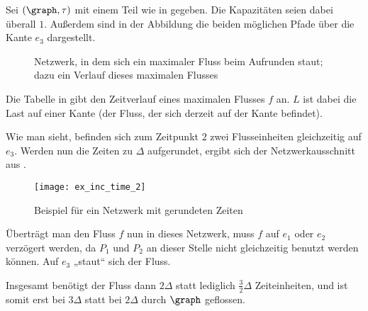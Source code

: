 \begin{example}
    Sei $(\graph, \tau)$ mit einem Teil wie in  gegeben.
    Die Kapazitäten seien dabei überall $1$. Außerdem sind in der Abbildung die
    beiden möglichen Pfade über die Kante $e_3$ dargestellt.

    \newsavebox{\tempbox}
    \begin{figure}[H]
    \subfloat{\usebox{\tempbox}}%
    \qquad
      \caption{Netzwerk, in dem sich ein maximaler Fluss beim Aufrunden staut;
        dazu ein Verlauf dieses maximalen Flusses}\label{fig:ex_inc_time_1}
    \end{figure}

    Die Tabelle in  gibt den Zeitverlauf eines maximalen Flusses
    $f$ an. $L$ ist dabei die Last auf einer Kante (der Fluss, der sich
    derzeit auf der Kante befindet).

    Wie man sieht, befinden sich zum Zeitpunkt $2$ zwei Flusseinheiten gleichzeitig
    auf $e_3$. Werden nun die Zeiten zu $\Delta$ aufgerundet, ergibt sich der
    Netzwerkausschnitt aus .

    \begin{figure}[H]
    \centering
    \texttt{[image: ex\_inc\_time\_2]}
    \caption{Beispiel für ein Netzwerk mit gerundeten Zeiten}
    \label{fig:ex_inc_time_2}
    \end{figure}

     Überträgt man den Fluss $f$ nun
    in dieses Netzwerk, muss $f$ auf $e_1$ oder $e_2$ verzögert werden, da $P_1$
    und $P_2$ an dieser Stelle nicht gleichzeitig benutzt werden können.
    Auf $e_3$ „staut“ sich der Fluss.

    Insgesamt benötigt der Fluss dann $2\Delta$ statt lediglich $\frac{3}{2}\Delta$
    Zeiteinheiten, und ist somit erst bei $3\Delta$ statt bei $2\Delta$ durch
    $\graph$ geflossen.
\end{example}

